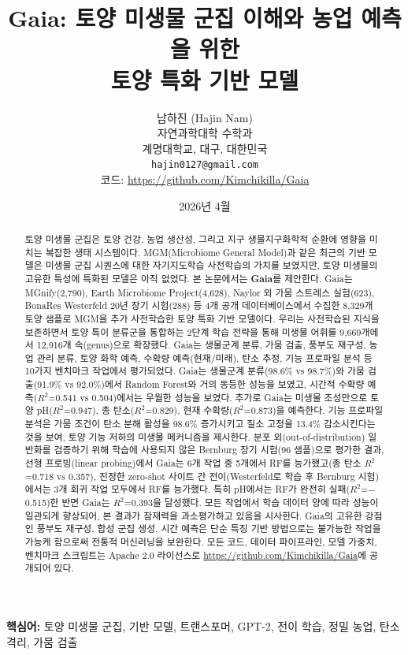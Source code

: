 \documentclass[11pt,a4paper]{article}
\title{\textbf{Gaia: 토양 미생물 군집 이해와 농업 예측을 위한\\토양 특화 기반 모델}}
\author{
  남하진 (Hajin Nam) \\
  자연과학대학 수학과 \\
  계명대학교, 대구, 대한민국 \\
  \texttt{hajin0127@gmail.com} \\
  코드: \url{https://github.com/Kimchikilla/Gaia}
}
\date{2026년 4월}
\begin{document}
\maketitle

\begin{abstract}
토양 미생물 군집은 토양 건강, 농업 생산성, 그리고 지구 생물지구화학적 순환에 영향을 미치는 복잡한 생태 시스템이다. MGM(Microbiome General Model)과 같은 최근의 기반 모델은 미생물 군집 시퀀스에 대한 자기지도학습 사전학습의 가치를 보였지만, 토양 미생물의 고유한 특성에 특화된 모델은 아직 없었다. 본 논문에서는 \textbf{Gaia}를 제안한다. Gaia는 MGnify(2,790), Earth Microbiome Project(4,628), Naylor 외 가뭄 스트레스 실험(623), BonaRes Westerfeld 20년 장기 시험(288) 등 4개 공개 데이터베이스에서 수집한 8,329개 토양 샘플로 MGM을 추가 사전학습한 토양 특화 기반 모델이다. 우리는 사전학습된 지식을 보존하면서 토양 특이 분류군을 통합하는 2단계 학습 전략을 통해 미생물 어휘를 9,669개에서 12,916개 속(genus)으로 확장했다. Gaia는 생물군계 분류, 가뭄 검출, 풍부도 재구성, 농업 관리 분류, 토양 화학 예측, 수확량 예측(현재/미래), 탄소 추정, 기능 프로파일 분석 등 10가지 벤치마크 작업에서 평가되었다. Gaia는 생물군계 분류(98.6\% vs 98.7\%)와 가뭄 검출(91.9\% vs 92.0\%)에서 Random Forest와 거의 동등한 성능을 보였고, 시간적 수확량 예측($R^2$=0.541 vs 0.504)에서는 우월한 성능을 보였다. 추가로 Gaia는 미생물 조성만으로 토양 pH($R^2$=0.947), 총 탄소($R^2$=0.829), 현재 수확량($R^2$=0.873)을 예측한다. 기능 프로파일 분석은 가뭄 조건이 탄소 분해 활성을 98.6\% 증가시키고 질소 고정을 13.4\% 감소시킨다는 것을 보여, 토양 기능 저하의 미생물 메커니즘을 제시한다. 분포 외(out-of-distribution) 일반화를 검증하기 위해 학습에 사용되지 않은 Bernburg 장기 시험(96 샘플)으로 평가한 결과, 선형 프로빙(linear probing)에서 Gaia는 6개 작업 중 5개에서 RF를 능가했고(총 탄소 $R^2$=0.718 vs 0.357), 진정한 zero-shot 사이트 간 전이(Westerfeld로 학습 후 Bernburg 시험)에서는 3개 회귀 작업 모두에서 RF를 능가했다. 특히 pH에서는 RF가 완전히 실패($R^2$=$-$0.515)한 반면 Gaia는 $R^2$=0.393을 달성했다. 모든 작업에서 학습 데이터 양에 따라 성능이 일관되게 향상되어, 본 결과가 잠재력을 과소평가하고 있음을 시사한다. Gaia의 고유한 강점인 풍부도 재구성, 합성 군집 생성, 시간 예측은 단순 특징 기반 방법으로는 불가능한 작업을 가능케 함으로써 전통적 머신러닝을 보완한다. 모든 코드, 데이터 파이프라인, 모델 가중치, 벤치마크 스크립트는 Apache 2.0 라이선스로 \url{https://github.com/Kimchikilla/Gaia}에 공개되어 있다.
\end{abstract}

\textbf{핵심어:} 토양 미생물 군집, 기반 모델, 트랜스포머, GPT-2, 전이 학습, 정밀 농업, 탄소 격리, 가뭄 검출
\end{document}
